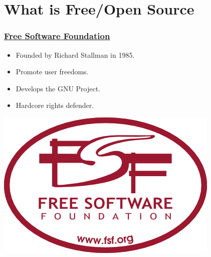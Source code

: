 \documentclass[hyperref={pdfpagelabels=false},xcolor=pst,pdf,fragile]{beamer}
\title{\Title}
\author{\Author\\ \Matricula}
\date{\today}
\begin{document}
\maketitle



\section{What is Free/Open Source}

\begin{frame}
  \frametitle{
	  \href{https://www.fsf.org}
	  {Free Software Foundation}
  }

  \begin{itemize}
	\item Founded by Richard Stallman in 1985.
	\item Promote user freedoms.
	\item Develops the GNU Project.
	\item Hardcore rights defender.
  \end{itemize}

  \begin{center}
	  \includegraphics[scale=0.4]{img/fsf.png}
  \end{center}

\end{frame}
\end{document}
